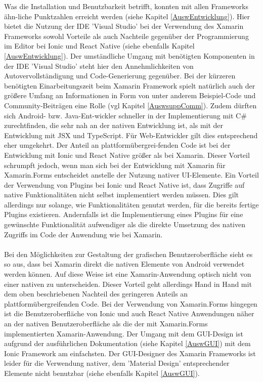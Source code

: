 Was die Installation und Benutzbarkeit betrifft, konnten mit allen Frameworks ähn-liche Punktzahlen erreicht werden (siehe Kapitel \ref{AuswEntwicklung}). Hier bietet die Nutzung der IDE 'Visual Studio' bei der Verwendung des Xamarin Frameworks sowohl Vorteile als auch Nachteile gegenüber der Programmierung im Editor bei Ionic und React Native (siehe ebenfalls Kapitel \ref{AuswEntwicklung}). Der umständliche Umgang mit benötigten Komponenten in der IDE 'Visual Studio' steht hier den Annehmlichkeiten von Autovervollständigung und Code-Generierung gegenüber. Bei der kürzeren benötigten Einarbeitungszeit beim Xamarin Framework spielt natürlich auch der größere Umfang an Informationen in Form von unter anderem Beispiel-Code und Community-Beiträgen eine Rolle (vgl Kapitel \ref{AuswsuppComm}). Zudem dürften sich Android- bzw. Java-Ent-wickler schneller in der Implementierung mit C\# zurechtfinden, die sehr nah an der nativen Entwicklung ist, als mit der Entwicklung mit JSX und TypeScript. Für Web-Entwickler gilt dies entsprechend eher umgekehrt. Der Anteil an plattformübergrei-fenden Code ist bei der Entwicklung mit Ionic und React Native größer als bei Xamarin. Dieser Vorteil schrumpft jedoch, wenn man sich bei der Entwicklung mit Xamarin für Xamarin.Forms entscheidet anstelle der Nutzung nativer UI-Elemente. Ein Vorteil der Verwendung von Plugins bei Ionic und React Native ist, dass Zugriffe auf native Funktionalitäten nicht selbst implementiert werden müssen. Dies gilt allerdings nur solange, wie Funktionalitäten genutzt werden, für die bereits fertige Plugins existieren. Andernfalls ist die Implementierung eines Plugins für eine gewünschte Funktionalität aufwendiger als die direkte Umsetzung des nativen Zugriffs im Code der Anwendung wie bei Xamarin. 
\\
\\
Bei den Möglichkeiten zur Gestaltung der grafischen Benutzeroberfläche sieht es so aus, dass bei Xamarin direkt die nativen Elemente von Android verwendet werden können. Auf diese Weise ist eine Xamarin-Anwendung optisch nicht von einer nativen zu unterscheiden. Dieser Vorteil geht allerdings Hand in Hand mit dem oben beschriebenen Nachteil des geringeren Anteils an plattformübergreifenden Code. Bei der Verwendung von Xamarin.Forms hingegen ist die Benutzeroberfläche von Ionic und auch React Native Anwendungen näher an der nativen Benutzeroberfläche als die der mit Xamarin.Forms implementierten Xamarin-Anwendung. Der Umgang mit dem GUI-Design ist aufgrund der ausführlichen Dokumentation (siehe Kapitel \ref{AuswGUI}) mit dem Ionic Framework am einfachsten. Der GUI-Designer des Xamarin Frameworks ist leider für die Verwendung nativer, dem 'Material Design' entsprechender Elemente nicht benutzbar (siehe ebenfalls Kapitel \ref{AuswGUI}). 
